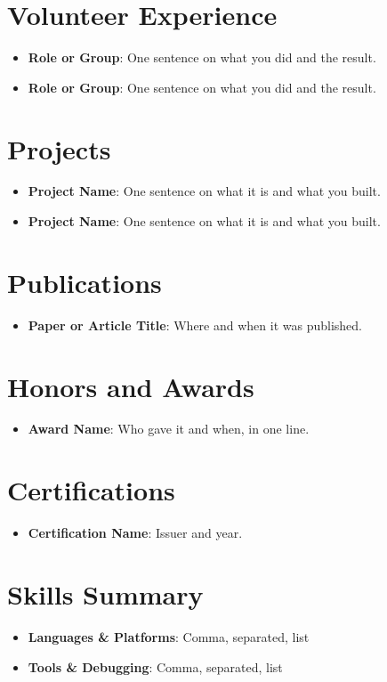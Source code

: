 \documentclass[a4paper,11pt]{article}
\newcommand{\resumeItem}[2]{
  \item\small{
    \textbf{#1}{: #2 \vspace{-2pt}}
  }
}
\newcommand{\resumeSubItem}[2]{\resumeItem{#1}{#2}\vspace{-3pt}}
\newcommand{\resumeSubHeadingListStart}{\begin{itemize}[leftmargin=*]}
\newcommand{\resumeSubHeadingListEnd}{\end{itemize}}
\begin{document}
\section{Volunteer Experience}
\resumeSubHeadingListStart
\resumeSubItem{Role or Group}{One sentence on what you did and the result.}
\resumeSubItem{Role or Group}{One sentence on what you did and the result.}
\resumeSubHeadingListEnd
\vspace{-10pt}

\section{Projects}
\resumeSubHeadingListStart
\resumeSubItem{Project Name}{One sentence on what it is and what you built.}
\resumeSubItem{Project Name}{One sentence on what it is and what you built.}
\resumeSubHeadingListEnd
\vspace{-10pt}

\section{Publications}
\resumeSubHeadingListStart
\resumeSubItem{Paper or Article Title}{Where and when it was published.}
\resumeSubHeadingListEnd
\vspace{-10pt}

\section{Honors and Awards}
\resumeSubHeadingListStart
\resumeSubItem{Award Name}{Who gave it and when, in one line.}
\resumeSubHeadingListEnd
\vspace{-10pt}

\section{Certifications}
\resumeSubHeadingListStart
\resumeSubItem{Certification Name}{Issuer and year.}
\resumeSubHeadingListEnd
\vspace{-10pt}

\section{Skills Summary}
\resumeSubHeadingListStart
\resumeSubItem{Languages \& Platforms}{Comma, separated, list}
\resumeSubItem{Tools \& Debugging}{Comma, separated, list}
\resumeSubHeadingListEnd

\end{document}
